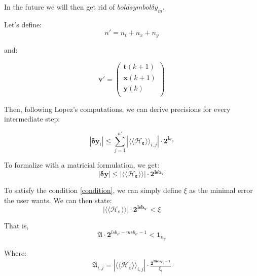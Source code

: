 		In the future we will then get rid of $boldsymbol{\delta y}_m$.

		Let's define:
			$$n'=n_t+n_x+n_y$$

		and:

			\begin{equation}
				\boldsymbol{v'}=
				\begin{pmatrix}
					\boldsymbol{t}(k+1) \\
					\boldsymbol{x}(k+1) \\
					\boldsymbol{y}(k)   \\
				\end{pmatrix}
			\end{equation}


		Then, following Lopez's computations, we can derive precisions for every intermediate step:
		
		\begin{equation}
			|\boldsymbol{\delta y}_i| \leq \sum_{j=1}^{n'} | \langle\langle \mathcal{H}_{\boldsymbol{\varepsilon}} \rangle\rangle_{i,j}| \cdot \boldsymbol{2^{l_{v'_j}}}
		\end{equation}

		To formalize with a matricial formulation, we get:
		\begin{equation}
			|\boldsymbol{\delta y}| \leq | \langle\langle \mathcal{H}_{\boldsymbol{\varepsilon}} \rangle\rangle| \cdot \boldsymbol{2^{lsb_{v'}}}
		\end{equation}


		To satisfy the condition \ref{condition}, we can simply define $\xi$ as the minimal error the user wants.
		We can then state:
		\begin{equation}
			| \langle\langle \mathcal{H}_{\boldsymbol{\varepsilon}} \rangle\rangle| \cdot \boldsymbol{2^{lsb_{v'}}} < \xi
		\end{equation}

		That is, 
		\begin{equation}
			\boldsymbol{\mathfrak{A}} \cdot \boldsymbol{2}^{lsb_{v'}-msb_{v'}-1} < \boldsymbol{1}_{n_y}
		\end{equation}

		Where:
		\begin{eqnarray} \label{constraint}
			\boldsymbol{\mathfrak{A}}_{i,j}= | \langle\langle \mathcal{H}_{\boldsymbol{\varepsilon}} \rangle\rangle_{i,j} | \cdot \frac{\boldsymbol{2^{msb_{v'_j}+1}}}{\xi_i} \\
		\end{eqnarray}

